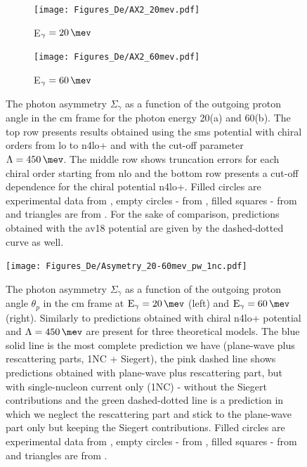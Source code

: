     \begin{figure}[h]
        \centering
        \begin{subfigure}[b]{0.46\textwidth}
            \caption{\small E$_\gamma = \SI{20}{\mev}$}
            \texttt{[image: Figures\_De/AX2\_20mev.pdf]}
            \label{AX_20_vert}
        \end{subfigure}
        \begin{subfigure}[b]{0.46\textwidth}
            \caption{\small E$_\gamma = \SI{60}{\mev}$}
            \texttt{[image: Figures\_De/AX2\_60mev.pdf]}
            \label{AX_60_vert}
        \end{subfigure}
        \caption{The photon asymmetry $\Sigma_\gamma$ 
        as a function of the outgoing proton angle in the \gls{cm} frame 
        for the photon energy \SI{20}{\mev}(a) and \SI{60}{\mev}(b).
        The top row presents results obtained using the \gls{sms} potential
        with chiral orders from \gls{lo} to \gls{n4lo+} and with the cut-off parameter $\Lambda=\SI{450}{\mev}$.
        The middle row shows truncation errors for each 
        chiral order starting from \gls{nlo} and the
        bottom row presents a cut-off dependence for the chiral potential \gls{n4lo+}.
        Filled circles are experimental data from \cite{KRAUSE1992_asymetry},
        empty circles - from \cite{depascale_asymmetry}, filled squares
        - from \cite{Barannik_asymetry} and triangles are from \cite{Vnukov_asymmetry}.
        For the sake of comparison, predictions obtained with the \gls{av18} potential are
        given by the dashed-dotted curve as well.}
        \label{assymetry}
    \end{figure}


    \begin{figure}[h]
        \begin{center}
        \texttt{[image: Figures\_De/Asymetry\_20-60mev\_pw\_1nc.pdf]}
        \end{center}
        \caption{The photon asymmetry $\Sigma_\gamma$ as a function of the
        outgoing proton angle $\theta_p$ in the \gls{cm} frame at $\text{E}_\gamma = \SI{20}{\mev}$
        (left) and $\text{E}_\gamma = \SI{60}{\mev}$(right).
        Similarly to  predictions obtained with chiral \gls{n4lo+} potential
        and $\Lambda=\SI{450}{\mev}$ are present for three theoretical models.
        The blue solid line is the most complete prediction we have 
        (plane-wave plus rescattering parts, 1NC + Siegert),
        the pink dashed line shows predictions obtained with
        plane-wave plus rescattering part, but with
        single-nucleon current only (1NC) - without the Siegert contributions and the green dashed-dotted line
        is a prediction in which we neglect the rescattering part
        and stick to the plane-wave part only but keeping the Siegert contributions.
        Filled circles are experimental data from \cite{KRAUSE1992_asymetry},
        empty circles - from \cite{depascale_asymmetry}, filled squares
        - from \cite{Barannik_asymetry} and triangles are from \cite{Vnukov_asymmetry}.}
        \label{asymmetry_energy_1NC}
    \end{figure}

